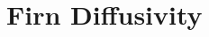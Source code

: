 \documentclass[../../CompleteThesis/Complete_1stDraft.tex]{subfiles}
\begin{document}
\section[Appendix I]{Firn Diffusivity}
\label{App:FirnDiffusivity}
\end{document}
